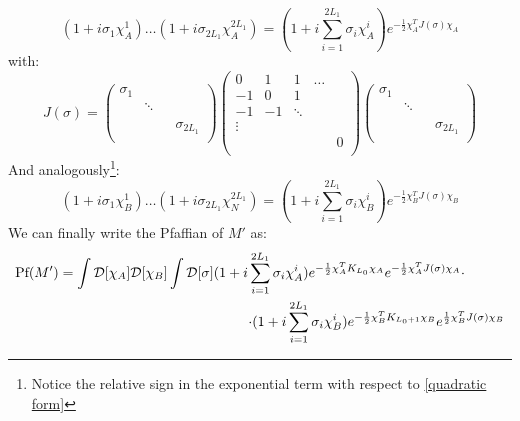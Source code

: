 \begin{equation}\label{quadratic form}
    (1 + i \sigma_1 \chi_A^1) \dots (1 + i \sigma_{2L_1} \chi_A^{2L_1}) = (1 + i \sum_{i = 1}^{2L_1} \sigma_i \chi_A^i) e^{-\frac{1}{2} \chi_A^T J(\sigma) \chi_A}
\end{equation}
with:
\begin{equation}
    J(\sigma) = \begin{pmatrix}
        \sigma_1 & \\
        & \ddots & \\
        \\
        & & & \sigma_{2L_1} \\
    \end{pmatrix}\begin{pmatrix}
        0 & 1 & 1 & \dots \\
        -1 & 0 & 1  \\
        -1 & - 1 & \ddots & \\
        \vdots & \\
        & & & & 0 \\
    \end{pmatrix}
    \begin{pmatrix}
        \sigma_1 & \\
        & \ddots & \\
        \\
        & & & \sigma_{2L_1} \\
    \end{pmatrix}
\end{equation}
And analogously\footnote{Notice the relative sign in the exponential term with respect to \eqref{quadratic form}}:
\begin{equation}
    (1 + i \sigma_1 \chi_B^1) \dots (1 + i \sigma_{2L_1} \chi_N^{2L_1}) = (1 + i \sum_{i = 1}^{2L_1} \sigma_i \chi_B^i) e^{-\frac{1}{2} \chi_B^T J(\sigma) \chi_B}
\end{equation}
We can finally write the Pfaffian of $M'$ as:
\begin{equation}
\begin{split}
        \textrm{Pf}(M') = \int \mathcal{D}[\chi_A]\mathcal{D}[\chi_B] \int \mathcal{D}[\sigma] (1 + i \sum_{i = 1}^{2L_1} \sigma_i \chi_A^i) e^{-\frac{1}{2} \chi_A^T K_{L_0}\chi_A} e^{-\frac{1}{2} \chi_A^T J(\sigma) \chi_A} \cdot \hspace{10mm} \\
        \hspace{5mm} \cdot (1 + i \sum_{i = 1}^{2L_1} \sigma_i \chi_B^i) e^{-\frac{1}{2} \chi_B^T K_{L_0 + 1}\chi_B} e^{\frac{1}{2} \chi_B^T J(\sigma) \chi_B} 
\end{split}
\end{equation}
